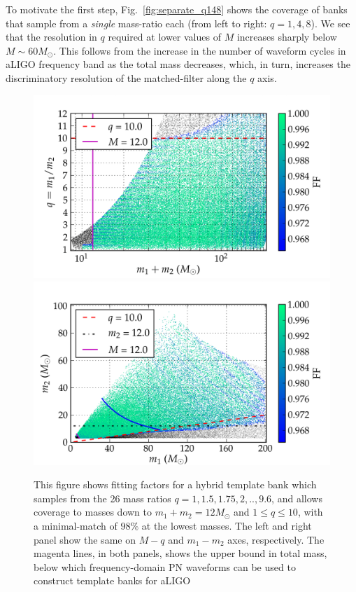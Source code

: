 To motivate the first step, Fig.~\ref{fig:separate_q148} shows the coverage of
banks that sample from a {\em single} mass-ratio each (from left to right: $q=1,4,8$). We see that the resolution
in $q$ required at lower values of $M$ increases sharply below 
$M\sim 60M_\odot$. This follows from the increase in the number of waveform
cycles in aLIGO frequency band as the total mass decreases, which, in turn,
increases the discriminatory resolution of the matched-filter along the $q$ axis.
\begin{figure}
\begin{center}
\includegraphics[width=0.8\columnwidth]{figures/nrhybbank/bank_seperate_q1-4-35-4-65-9-6_01_mtot200_match-tiny.png}
\includegraphics[width=0.8\columnwidth]{figures/nrhybbank/bank_seperate_q1-4-35-4-65-9-6_01_m1m2200_match-tiny.png}
\caption{\label{fig:templatebank_halfMassRatios}This figure shows
  fitting factors for a hybrid template bank which samples from the 26 mass
  ratios $q=1,1.5,1.75,2,..,9.6$, and allows coverage to masses down to 
  $m_1 + m_2 = 12M_{\odot}$ and $1\leq q\leq 10$, with a minimal-match of $98\%$
  at the lowest masses. 
  The left and right panel show the same on $M-q$ and $m_1-m_2$ axes, 
  respectively. The magenta lines, in both panels, shows the upper bound 
  in total mass, below which frequency-domain PN waveforms can be used to construct template banks for aLIGO
}
\end{center}
\end{figure}
